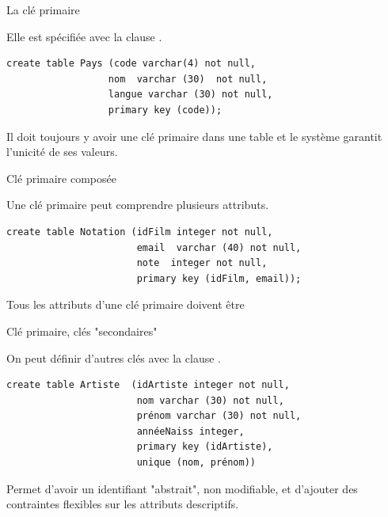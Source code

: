 \begin{frame}[fragile]{La clé primaire}

Elle est spécifiée avec la clause  .

\vfill

\begin{verbatim}
create table Pays (code varchar(4) not null,
                  nom  varchar (30)  not null,
                  langue varchar (30) not null,
                  primary key (code));
\end{verbatim}

\vfill
\begin{blocgauche}
Il doit \alert{toujours} y avoir une clé primaire
dans une table et le système garantit l'unicité de ses valeurs.
\end{blocgauche}
\end{frame}

\begin{frame}[fragile]{Clé primaire composée}

Une clé primaire peut comprendre plusieurs attributs.

\vfill

\begin{verbatim}
create table Notation (idFilm integer not null,
                       email  varchar (40) not null,
                       note  integer not null,
                       primary key (idFilm, email));
\end{verbatim}

\vfill
\begin{blocgauche}
Tous les attributs d'une clé primaire doivent être 
\end{blocgauche}
\end{frame}


\begin{frame}[fragile]{Clé primaire, clés "secondaires"}

On peut définir d'autres clés avec la clause .

\vfill

\begin{verbatim}
create table Artiste  (idArtiste integer not null,
                       nom varchar (30) not null,
                       prénom varchar (30) not null,
                       annéeNaiss integer,
                       primary key (idArtiste),
                       unique (nom, prénom))
\end{verbatim}

\vfill

\begin{blocgauche}
Permet d'avoir un identifiant "abstrait", non modifiable, et d'ajouter des
contraintes flexibles sur les attributs descriptifs.
\end{blocgauche}
\end{frame}


